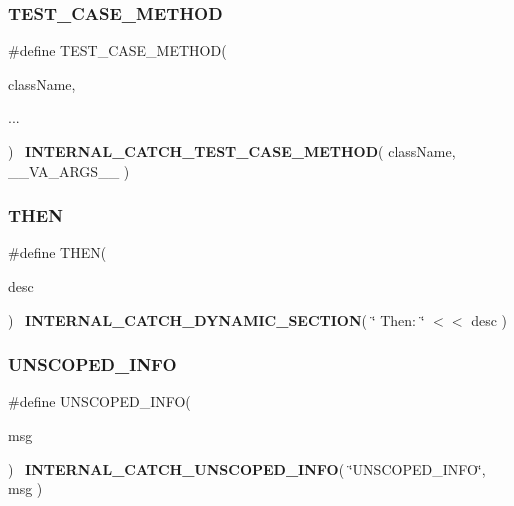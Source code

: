 \mbox{\label{catch_8hpp_adf06142f54a9e271590fa0e270bc41d2}} 
\subsubsection{TEST\_CASE\_METHOD}
{\footnotesize\ttfamily \#define T\+E\+S\+T\+\_\+\+C\+A\+S\+E\+\_\+\+M\+E\+T\+H\+OD(\begin{DoxyParamCaption}\item[{}]{class\+Name,  }\item[{}]{... }\end{DoxyParamCaption})~\textbf{ I\+N\+T\+E\+R\+N\+A\+L\+\_\+\+C\+A\+T\+C\+H\+\_\+\+T\+E\+S\+T\+\_\+\+C\+A\+S\+E\+\_\+\+M\+E\+T\+H\+OD}( class\+Name, \+\_\+\+\_\+\+V\+A\+\_\+\+A\+R\+G\+S\+\_\+\+\_\+ )}

\mbox{\label{catch_8hpp_a27987092139727fd7a471b5f74dc62de}} 
\subsubsection{THEN}
{\footnotesize\ttfamily \#define T\+H\+EN(\begin{DoxyParamCaption}\item[{}]{desc }\end{DoxyParamCaption})~\textbf{ I\+N\+T\+E\+R\+N\+A\+L\+\_\+\+C\+A\+T\+C\+H\+\_\+\+D\+Y\+N\+A\+M\+I\+C\+\_\+\+S\+E\+C\+T\+I\+ON}( \char`\"{}     Then\+: \char`\"{} $<$$<$ desc )}

\mbox{\label{catch_8hpp_a8dd723bbdb751f1c2f3af8c4f264b7a3}} 
\subsubsection{UNSCOPED\_INFO}
{\footnotesize\ttfamily \#define U\+N\+S\+C\+O\+P\+E\+D\+\_\+\+I\+N\+FO(\begin{DoxyParamCaption}\item[{}]{msg }\end{DoxyParamCaption})~\textbf{ I\+N\+T\+E\+R\+N\+A\+L\+\_\+\+C\+A\+T\+C\+H\+\_\+\+U\+N\+S\+C\+O\+P\+E\+D\+\_\+\+I\+N\+FO}( \char`\"{}U\+N\+S\+C\+O\+P\+E\+D\+\_\+\+I\+N\+FO\char`\"{}, msg )}

\mbox{\label{catch_8hpp_a108d6c5c51dd46e82a62b262394f0242}} 
